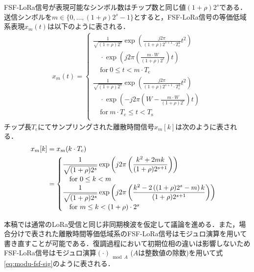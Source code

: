 \documentclass[technicalreport]{ieicej}
\begin{document}
FSF-LoRa信号が表現可能なシンボル数はチップ数と同じ値$(1+\rho)2^s$である．送信シンボルを$m\in \{0,\ldots,(1+\rho)2^s-1\}$とすると，FSF-LoRa信号の等価低域系表現$x_m(t)$は以下のように表される．
\begin{align}
x_m(t)=
\begin{cases}
    \displaystyle\frac{1}{\sqrt{(1+\rho)2^s}}\exp\left(\frac{j2\pi}{(1+\rho)2^{s+1}\cdot T_\mathrm{c}^2}t^2\right)\\
\quad\cdot\exp\left(j2\pi\left(\frac{m\cdot W}{(1+\rho)2^s}\right)t\right)\\
\quad \mathrm{for}\ 0\le t<m\cdot T_\mathrm{c}\\
\displaystyle \frac{1}{\sqrt{(1+\rho)2^s}}\exp\left(\frac{j2\pi}{(1+\rho)2^{s+1}\cdot T_\mathrm{c}^2}t^2\right)\\
\quad\cdot\exp\left(-j2\pi\left(W-\frac{m\cdot W}{(1+\rho)2^s}\right)t\right)\\
\quad\mathrm{for}\ m\cdot T_\mathrm{c}\le t< T_\mathrm{s}\\
\end{cases}
\end{align}
チップ長$T_\mathrm{c}$にてサンプリングされた離散時間信号$x_m[k]$は次のように表される．
\begin{align}
    x_m[k]&=x_m(k\cdot T_\mathrm{c})\notag\\
&=
\begin{cases}
    \displaystyle\frac{1}{\sqrt{(1+\rho)2^s}}\exp\left(j2\pi\left(\frac{k^2+2mk}{(1+\rho)2^{s+1}}\right)\right)\\\quad \mathrm{for}\ 0\le k<m
\\
\displaystyle \frac{1}{\sqrt{(1+\rho)2^s}}\exp\left(j2\pi\left(\frac{k^2-2\left((1+\rho)2^s-m\right)k}{(1+\rho)2^{s+1}}\right)\right)\\
\quad \mathrm{for}\ m\le k<(1+\rho)\cdot 2^s
\end{cases}
\end{align}

本稿では通常のLoRa受信と同じ非同期検波を仮定して議論を進める．また，場合分けで表された離散時間等価低域系のFSF-LoRa信号はモジュロ演算を用いて書き直すことが可能である．復調過程において初期位相の違いは影響しないためFSF-LoRa信号はモジュロ演算$(\cdot)_{\bmod{A}}$ ($A$は整数値の除数)を用いて式\eqref{eq:modu-fsf-sig}のように表される．
\end{document}
